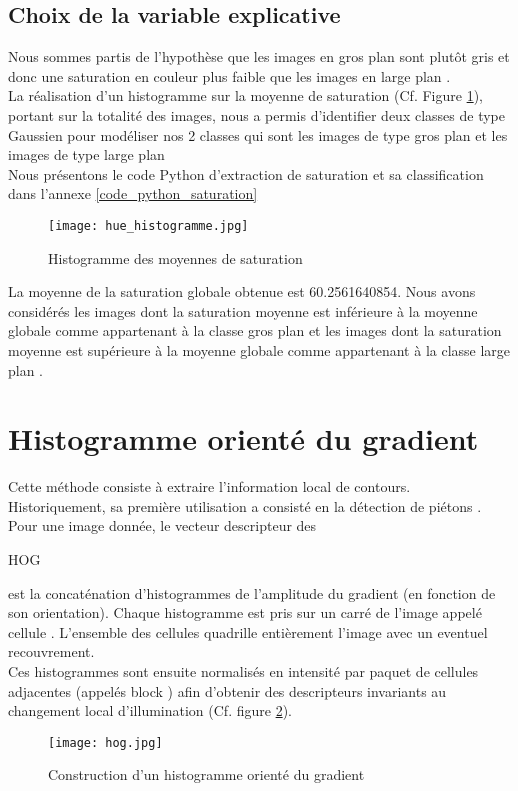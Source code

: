 \documentclass{book}
\begin{document}
\subsection{Choix de la variable explicative}

Nous sommes partis de l’hypothèse que les images en \og gros plan \fg{} sont plutôt gris et donc une saturation en couleur plus faible que les images en \og large plan \fg{}.\\
La réalisation d’un histogramme sur la moyenne de saturation (Cf. Figure \ref{hue_histo}), portant sur la totalité des images, nous a permis d’identifier deux classes de type Gaussien pour modéliser nos 2 classes
qui sont les images de type \og gros plan \fg{} et les images de type \og large plan \fg{}\\
Nous présentons le code Python d'extraction de saturation et sa classification dans l'annexe \ref{code_python_saturation}
\label{hue_frontiere}
\begin{figure}[H]
\begin{center}
\texttt{[image: hue\_histogramme.jpg]}
\end{center}
\caption{Histogramme des moyennes de saturation}
\label{hue_histo}
\end{figure}

La moyenne de la saturation globale obtenue est 60.2561640854. 
Nous avons considérés les images dont la saturation moyenne est inférieure à la moyenne globale comme appartenant à la classe \og gros plan \fg{} et les images dont 
la saturation moyenne est supérieure à la moyenne globale comme appartenant à la classe \og large plan \fg{}.

\section{Histogramme orienté du gradient}

Cette méthode consiste à extraire l'information local de contours. Historiquement, sa première utilisation a consisté en 
la détection de piétons \cite{hog}. Pour une image donnée, le vecteur descripteur des \begin{itshape}HOG\end{itshape} est la concaténation
d'histogrammes de l'amplitude du gradient (en fonction de son orientation). Chaque histogramme est pris sur un carré de l'image
appelé \og cellule \fg{}. L'ensemble des cellules quadrille entièrement l'image avec un eventuel recouvrement.\\
Ces histogrammes sont ensuite normalisés en intensité par paquet de cellules adjacentes (appelés \og block \fg{}) afin d'obtenir des descripteurs 
invariants au changement local d'illumination (Cf. figure \ref{hog}).
\begin{figure}[H]
\begin{center}
\texttt{[image: hog.jpg]}
\end{center}
\caption{Construction d'un histogramme orienté du gradient \cite{hog2}}
\label{hog}
\end{figure}
\end{document}
